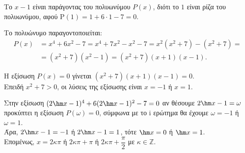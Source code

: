 \begin{alist}
\item Το $x-1$ είναι παράγοντας του πολυωνύμου $P(x)$, διότι το $1$ είναι ρίζα του πολυωνύμου, αφού $\text{P}(1) = 1 + 6 \cdot 1 - 7 = 0$.
\item Το πολυώνυμο παραγοντοποιείται:
\begin{align*}
P(x) &= x^4 + 6x^2 - 7 = x^4 + 7x^2 - x^2 - 7 = x^2(x^2 + 7) - (x^2 + 7) = \\
&= (x^2 + 7)(x^2 - 1) = (x^2 + 7)(x + 1)(x - 1).
\end{align*}
\item 
\begin{rlist}
\item Η εξίσωση $P(x) = 0$ γίνεται $(x^2 + 7)(x + 1)(x - 1) = 0$. \\
Επειδή $x^2 + 7 > 0$, οι λύσεις της εξίσωσης είναι $x = -1$ ή $x = 1$.
\item Στην εξίσωση $(2\hm  x - 1)^4 + 6(2\hm  x - 1)^2 - 7 = 0$ αν θέσουμε $2\hm  x - 1 = \omega$ προκύπτει η εξίσωση $P(\omega) = 0$, σύμφωνα με το $\text{i}$ ερώτημα θα έχουμε $\omega = -1$ ή $\omega = 1$. \\
Άρα, $2\hm  x - 1 = -1$ ή $2\hm  x - 1 = 1$, τότε $\hm  x = 0$ ή $\hm  x = 1$. \\
Επομένως, $x = 2\kappa\pi$ ή $2\kappa\pi + \pi$ ή $2\kappa\pi + \dfrac{\pi}{2}$ με $\kappa \in \mathbb{Z}$.
\end{rlist}
\end{alist}

